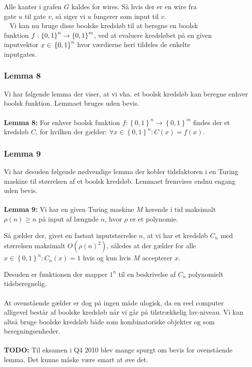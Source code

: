 Alle kanter i grafen $G$ kaldes for wires. Så hvis der er en wire fra        \\
gate $u$ til gate $v$, så siger vi $u$ fungerer som input til $v$.           \\
~ Vi kan nu bruge disse boolske kredsløb til at beregne en boolsk            \\
funktion $f: \left\lbrace 0,1 \right\rbrace^n \rightarrow \left\lbrace 0,1    \\
\right\rbrace^m$, ved at evaluere kredsløbet på en given inputvektor $x \in \\
\left\lbrace 0,1 \right\rbrace^n$ hvor værdierne heri tildeles de enkelte    \\
inputgates.                                                                   \\

\subsubsection{Lemma 8}

Vi har følgende lemma der viser, at vi vha. et boolsk kredsløb kan beregne
enhver boolsk funktion. Lemmaet bruges uden bevis.\\ ~\\ \textbf{Lemma 8:}
For enhver boolsk funktion $f: \left\lbrace 0,1 \right\rbrace^n \rightarrow
\left\lbrace 0,1 \right\rbrace^m$ findes der et kredsløb $C$, for hvilken der
gælder: $\forall x \in \left\lbrace 0,1 \right\rbrace^n: C(x) = f(x)$.

\subsubsection{Lemma 9}

Vi har desuden følgende nødvendige lemma der kobler tidsfaktoren i en Turing
maskine til størrelsen af et boolsk kredsløb. Lemmaet fremvises endnu engang
uden bevis.\\ ~\\ \textbf{Lemma 9:} Vi har en given Turing maskine $M$ kørende
i tid maksimalt $\rho(n) \geq n$ på input af længnde $n$, hvor $\rho$ er et
polynomie.

Så gælder der, givet en fastsat inputstørrelse $n$, at vi har et kredsløb
$C_n$ med størrelsen maksimalt $O(\rho(n)^2)$, således at der gælder for
alle $x \in \left\lbrace 0,1 \right\rbrace^n: C_n(x) = 1$ hvis og kun hvis $M$
accepterer $x$.

Desuden er funktionen der mapper $1^n$ til en beskrivelse af $C_n$ polynomielt
tidsberegnelig.\\ ~\\ At ovenstående gælder er dog på ingen måde ulogisk,
da en reel computer alligevel består af boolske kredsløb når vi går på
tilstrækkelig lav-niveau. Vi kan altså bruge boolske kredsløb både som
kombinatoriske objekter og som beregningsenheder. \\ ~\\ \textbf{TODO: } Til
eksamen i Q4 2010 blev mange spurgt om bevis for ovenstående lemma. Det kunne
måske være smart at øve det.

